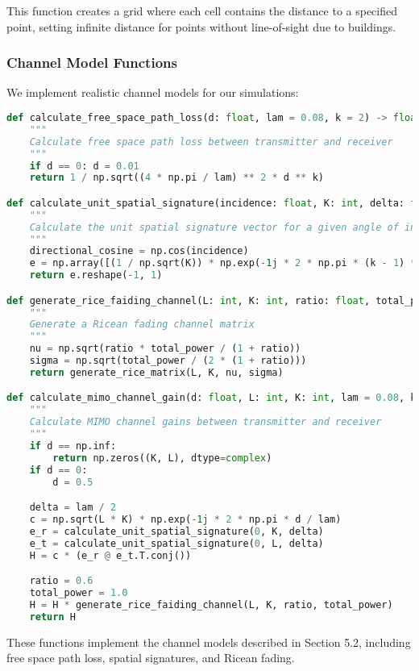 This function creates a grid where each cell contains the distance to a specified point, setting infinite distance for points without line-of-sight due to buildings.

\newpage
\subsubsection{Channel Model Functions}

We implement realistic channel models for our simulations:

\begin{lstlisting}[language=python, caption={Channel Modeling Functions}]
def calculate_free_space_path_loss(d: float, lam = 0.08, k = 2) -> float:
    """
    Calculate free space path loss between transmitter and receiver
    """
    if d == 0: d = 0.01
    return 1 / np.sqrt((4 * np.pi / lam) ** 2 * d ** k)

def calculate_unit_spatial_signature(incidence: float, K: int, delta: float):
    """
    Calculate the unit spatial signature vector for a given angle of incidence
    """
    directional_cosine = np.cos(incidence)
    e = np.array([(1 / np.sqrt(K)) * np.exp(-1j * 2 * np.pi * (k - 1) * delta * directional_cosine) for k in range(K)])
    return e.reshape(-1, 1)

def generate_rice_faiding_channel(L: int, K: int, ratio: float, total_power = 1.0) -> np.ndarray:
    """
    Generate a Ricean fading channel matrix
    """
    nu = np.sqrt(ratio * total_power / (1 + ratio))
    sigma = np.sqrt(total_power / (2 * (1 + ratio)))
    return generate_rice_matrix(L, K, nu, sigma)

def calculate_mimo_channel_gain(d: float, L: int, K: int, lam = 0.08, k = 2) -> tuple[np.ndarray, float]:
    """
    Calculate MIMO channel gains between transmitter and receiver
    """
    if d == np.inf:
        return np.zeros((K, L), dtype=complex)
    if d == 0:
        d = 0.5

    delta = lam / 2
    c = np.sqrt(L * K) * np.exp(-1j * 2 * np.pi * d / lam)
    e_r = calculate_unit_spatial_signature(0, K, delta)
    e_t = calculate_unit_spatial_signature(0, L, delta)
    H = c * (e_r @ e_t.T.conj())

    ratio = 0.6
    total_power = 1.0
    H = H * generate_rice_faiding_channel(L, K, ratio, total_power)
    return H
\end{lstlisting}

These functions implement the channel models described in Section 5.2, including free space path loss, spatial signatures, and Ricean fading.

